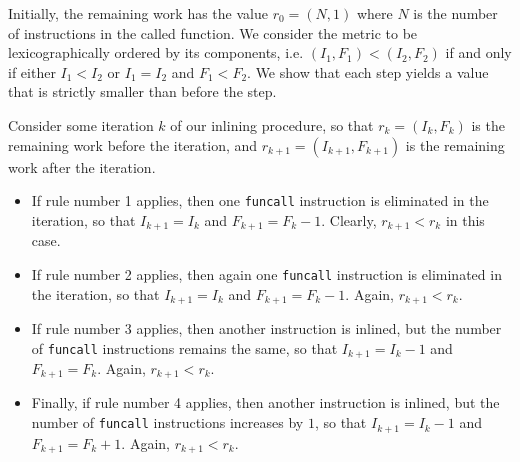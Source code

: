 Initially, the remaining work has the value $r_0 = (N,1)$ where $N$ is
the number of instructions in the called function.  We consider the
metric to be lexicographically ordered by its components, i.e. $(I_1,
F_1) < (I_2, F_2)$ if and only if either $I_1 < I_2$ or $I_1 = I_2$
and $F_1 < F_2$.  We show that each step yields a value that is
strictly smaller than before the step.

Consider some iteration $k$ of our inlining procedure, so that $r_k =
(I_k,F_k)$ is the remaining work before the iteration, and $r_{k+1} =
(I_{k+1},F_{k+1})$ is the remaining work after the iteration.

\begin{itemize}
\item If rule number 1 applies, then one \texttt{funcall} instruction
  is eliminated in the iteration, so that $I_{k+1} = I_k$ and $F_{k+1}
  = F_k-1$.  Clearly, $r_{k+1} < r_k$ in this case.
\item If rule number 2 applies, then again one \texttt{funcall}
  instruction is eliminated in the iteration, so that $I_{k+1} = I_k$
  and $F_{k+1} = F_k-1$.  Again, $r_{k+1} < r_k$.
\item If rule number 3 applies, then another instruction is inlined,
  but the number of \texttt{funcall} instructions remains the same, so
  that $I_{k+1} = I_k-1$ and $F_{k+1} = F_k$.  Again, $r_{k+1} < r_k$.
\item Finally, if rule number 4 applies, then another instruction is inlined,
  but the number of \texttt{funcall} instructions increases by $1$, so
  that $I_{k+1} = I_k-1$ and $F_{k+1} = F_k+1$.  Again, $r_{k+1} < r_k$.
\end{itemize}

\begin{figure}
\end{figure}

\begin{figure}
\end{figure}

\begin{figure}
\end{figure}

\begin{figure}
\end{figure}

